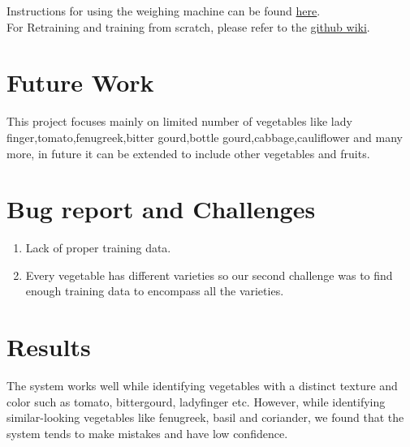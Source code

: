 \documentclass[a4paper,12pt,oneside]{book}
\begin{document}
Instructions for using the weighing machine can be found \href{https://github.com/eYSIP-2017/eYSIP-2017_Vegetable-Identification-Using-Transfer-Learning/tree/master/Documentation/Manuals}{here}.\\
For Retraining and training from scratch, please refer to the \href{https://github.com/eYSIP-2017/eYSIP-2017_Vegetable-Identification-Using-Transfer-Learning/wiki}{github wiki}.

 

\section{Future Work}
This project focuses mainly on limited number of vegetables like lady finger,tomato,fenugreek,bitter gourd,bottle gourd,cabbage,cauliflower and many more, in future it can be extended to include other vegetables and fruits.
\newpage
\section{Bug report and Challenges}
\begin{enumerate}
	\item Lack of proper training data.
	\item Every vegetable has different varieties so our second challenge was to find enough training data to encompass all the varieties.
\end{enumerate}

\section{Results}
The system works well while identifying vegetables with a distinct texture and color such as tomato, bittergourd, ladyfinger etc. However, while identifying similar-looking vegetables like fenugreek, basil and coriander, we found that the system tends to make mistakes and have low confidence.



\end{document}
